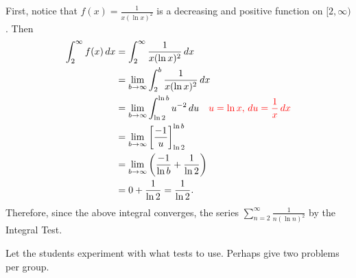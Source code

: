 \documentclass[noinstructornotes]{ximera}
\begin{document}
\begin{problem}
\begin{freeResponse}
\begin{enumerate}
		First, notice that $f(x) = \frac{1}{x (\ln x)^2}$ is a decreasing and positive function on $[2,\infty)$.
		Then
			\begin{align*}
			\int_2^\infty f(x) \,d x 
			&= \int_2^\infty \frac{1}{x (\ln x)^2} \,d x  \\
			&= \lim_{b \to \infty} \int_2^b \frac{1}{x (\ln x)^2} \,d x  \\
			&= \lim_{b \to \infty} \int_{\ln 2}^{\ln b} u^{-2} \,d u  \quad  {\color{red} u = \ln x, \,du = \frac{1}{x} \,dx}  \\
			&= \lim_{b \to \infty} \bigg[ \frac{-1}{u} \bigg]_{\ln 2}^{\ln b}  \\
			&= \lim_{b \to \infty} \left( \frac{-1}{\ln b} + \frac{1}{\ln 2} \right)  \\
			&= 0 + \frac{1}{\ln 2} = \frac{1}{\ln 2}.
			\end{align*}
		Therefore, since the above integral converges, the series $\sum_{n=2}^\infty \frac{1}{n(\ln n)^2}$  by the Integral Test.
	
%
		
		\end{enumerate}
	\end{freeResponse}
	
\end{problem}

\begin{instructorNotes}
Let the students experiment with what tests to use.  
Perhaps give two problems per group.
\end{instructorNotes}
\end{document}
